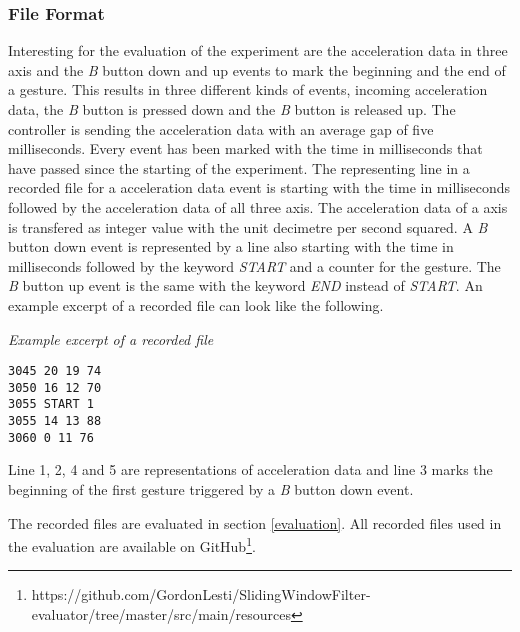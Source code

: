 \subsubsection{File Format} \label{file_format}
Interesting for the evaluation of the experiment are the acceleration data in three axis and the \textit{B} button down
and up events to mark the beginning and the end of a gesture. This results in three different kinds of events, incoming
acceleration data, the \textit{B} button is pressed down and the \textit{B} button is released up. The controller is
sending the acceleration data with an average gap of five milliseconds. Every event has been marked with the time
in milliseconds that have passed since the starting of the experiment. The representing line in a recorded file for a
acceleration data event is starting with the time in milliseconds followed by the acceleration data of all three axis.
The acceleration data of a axis is transfered as integer value with the unit decimetre per second squared. A \textit{B}
button down event is represented by a line also starting with the time in milliseconds followed by the keyword
\textit{START} and a counter for the gesture. The \textit{B} button up event is the same with the keyword \textit{END}
instead of \textit{START}. An example excerpt of a recorded file can look like the following.

\medskip
\noindent
{\it Example excerpt of a recorded file}
\begin{verbatim}
3045 20 19 74
3050 16 12 70
3055 START 1
3055 14 13 88
3060 0 11 76
\end{verbatim}
\noindent
{\small Line 1, 2, 4 and 5 are representations of acceleration data and line 3 marks the beginning of the first gesture
triggered by a \textit{B} button down event.}

\medskip

The recorded files are evaluated in section \ref{evaluation}. All
recorded files used in the evaluation are available on
GitHub\footnote{https://github.com/GordonLesti/SlidingWindowFilter-evaluator/tree/master/src/main/resources}.
